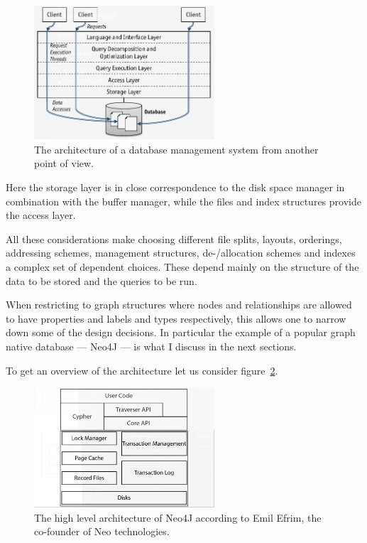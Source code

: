 \documentclass[a4paper,10pt]{article}
\begin{document}
\begin{figure}[htp]\label{dbms_arch_layers}
 \begin{center}
  \includegraphics[keepaspectratio,width=0.6\textwidth]{img/layered_RDBMS.png}
 \end{center}
 \caption{The architecture of a database management system from another point of view.} %
\end{figure}

Here the storage layer is in close correspondence to the disk space manager in combination with the buffer manager, while the files and index structures provide the access layer.

All these considerations make choosing different file splits, layouts, orderings, addressing schemes, management structures, de-/allocation schemes and indexes a complex set of dependent choices. 
These depend mainly on the structure of the data to be stored and the queries to be run. 

When restricting to graph structures where nodes and relationships are allowed to have properties and labels and types respectively, this allows one to narrow down some of the design decisions. In particular the example of a popular graph native database --- Neo4J --- is what I discuss in the next sections. 

To get an overview of the architecture let us consider figure~\ref{N4J_HLA_Emil}. 

\begin{figure}[htp]\label{N4J_HLA_Emil}
 \begin{center}
  \includegraphics[keepaspectratio,width=0.6\textwidth]{img/N4J_HLA_Emil.png}
 \end{center}
 \caption{The high level architecture of Neo4J according to Emil Efrim, the co-founder of Neo technologies.} %
\end{figure}
\end{document}
